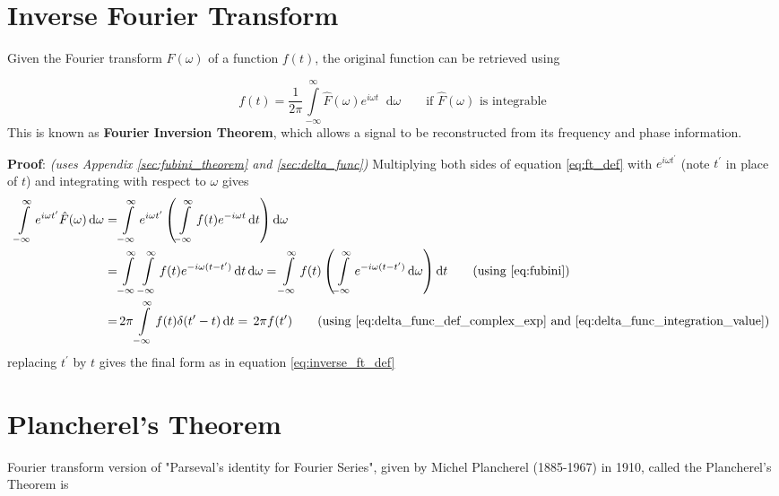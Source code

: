 \documentclass[11pt, a4paper]{article}
\let\oldsection\section
\renewcommand{\section}{%
	\setcounter{equation}{0}%
	\oldsection%
}
\newcommand{\eqrefnp}[1]{\textup{\ref{#1}}}
\newcommand{\primed}[1]{#1^{\prime}}
\newcommand{\tp}{\primed{t}}	%
\newcommand{\diff}{\mathop{}\!\mathrm{d}}
\newcommand{\dt}{\diff t}
\newcommand{\domega}{\diff \omega}
\newcommand{\dint}[2]{\int \limits_{#1}^{#2}}  %
\newcommand{\intinfty}{\dint{-\infty}{\infty}}	%
\newcommand{\iintinfty}{\intinfty \intinfty}	%
\begin{document}
\section{Inverse Fourier Transform}\label{sec:inverse_fourier_transform}
Given the Fourier transform $\hat{F}(\omega)$ of a function $f(t)$, the original function can be retrieved using

\begin{equation}\label{eq:inverse_ft_def}
	\boxed{
		f(t) = \frac{1}{2\pi} \intinfty \hat{F}(\omega)e^{i\omega t} \domega
	} \qquad \text{if $\hat{F}(\omega)$ is integrable}
\end{equation}
This is known as \textbf{Fourier Inversion Theorem}, which allows a signal to be reconstructed from its frequency and 
phase information. \cite{herman2016fourieranalysis}

\vspace{4pt}
\textbf{Proof}: \textit{(uses Appendix \ref{sec:fubini_theorem} and \ref{sec:delta_func})} Multiplying both sides of equation \eqref{eq:ft_def} with $e^{i\omega \tp}$ (note $\tp$ in place of $t$) and integrating with respect to $\omega$ gives
\begin{align*}
	\intinfty e^{i\omega \tp} \hat{F}(\omega) \domega 
	= & \intinfty e^{i\omega \tp} \left(\intinfty f(t) e^{-i\omega t} \dt \right) \domega \\
	= & \iintinfty f(t) e^{-i\omega (t - \tp)} \dt \domega
	= \intinfty f(t) \left(\intinfty  e^{-i\omega (t - \tp)} \domega \right) \dt \tag{using \eqrefnp{eq:fubini}} \\
	= & \, 2 \pi \intinfty f(t) \delta (\tp - t) \dt = \, 2 \pi f(\tp) \tag{using \eqrefnp{eq:delta_func_def_complex_exp} and \eqrefnp{eq:delta_func_integration_value}}
\end{align*} 
replacing $\tp$ by $t$ gives the final form as in equation \eqref{eq:inverse_ft_def}

\section{Plancherel's Theorem}\label{sec:plancherel_theorem}
Fourier transform version of "Parseval's identity for Fourier Series", given by Michel Plancherel (1885-1967) in 1910, called the Plancherel's Theorem is \cite{herman2016fourieranalysis}
\end{document}
